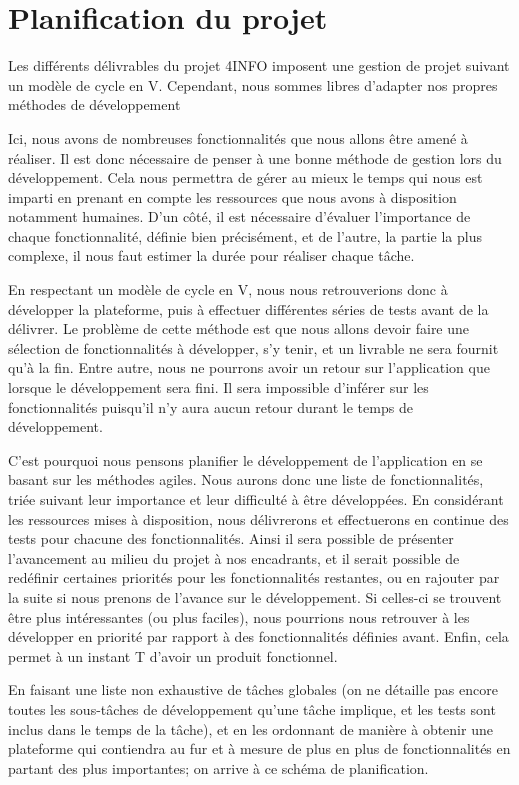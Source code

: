 \section{Planification du projet}
\label{sec:orga}

	Les différents délivrables du projet 4INFO imposent une gestion de projet suivant un modèle de cycle en V. Cependant, nous sommes libres d'adapter nos propres méthodes de développement 

	Ici, nous avons de nombreuses fonctionnalités que nous allons être amené à réaliser. Il est donc nécessaire de penser à une bonne méthode de gestion lors du développement. Cela nous permettra de gérer au mieux le temps qui nous est imparti en prenant en compte les ressources que nous avons à disposition notamment humaines. D'un côté, il est nécessaire d'évaluer l'importance de chaque fonctionnalité, définie bien précisément, et de l'autre, la partie la plus complexe, il nous faut estimer la durée pour réaliser chaque tâche.

	En respectant un modèle de cycle en V, nous nous retrouverions donc à développer la plateforme, puis à effectuer différentes séries de tests avant de la délivrer. Le problème de cette méthode est que nous allons devoir faire une sélection de fonctionnalités à développer, s'y tenir, et un livrable ne sera fournit qu'à la fin. Entre autre, nous ne pourrons avoir un retour sur l'application que lorsque le développement sera fini. Il sera impossible d'inférer sur les fonctionnalités puisqu'il n'y aura aucun retour durant le temps de développement. 

	C'est pourquoi nous pensons planifier le développement de l'application en se basant sur les méthodes agiles. Nous aurons donc une liste de fonctionnalités, triée suivant leur importance et leur difficulté à être développées. En considérant les ressources mises à disposition, nous délivrerons et effectuerons en continue des tests pour chacune des fonctionnalités. Ainsi il sera possible de présenter l'avancement au milieu du projet à nos encadrants, et il serait possible de redéfinir certaines priorités pour les fonctionnalités restantes, ou en rajouter par la suite si nous prenons de l'avance sur le développement. Si celles-ci se trouvent être plus intéressantes (ou plus faciles), nous pourrions nous retrouver à les développer en priorité par rapport à des fonctionnalités définies avant. Enfin, cela permet à un instant T d'avoir un produit fonctionnel.

	En faisant une liste non exhaustive de tâches globales (on ne détaille pas encore toutes les sous-tâches de développement qu'une tâche implique, et les tests sont inclus dans le temps de la tâche), et en les ordonnant de manière à obtenir une plateforme qui contiendra au fur et à mesure de plus en plus de fonctionnalités en partant des plus importantes; on arrive à ce schéma de planification.

